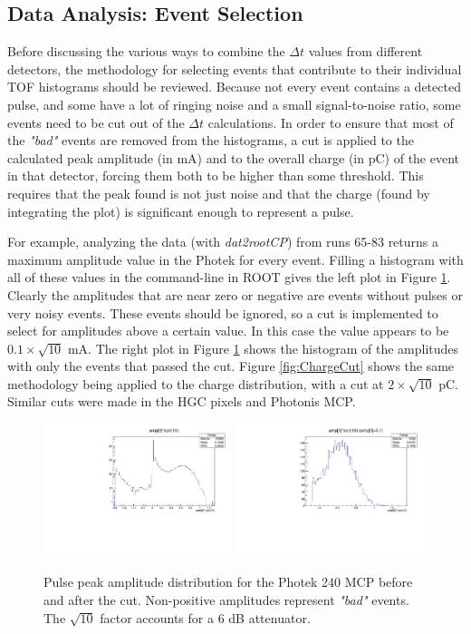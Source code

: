 \documentclass[12pt]{article}
\begin{document}
\subsection{Data Analysis: Event Selection}
Before discussing the various ways to combine the $\Delta t$ values from different detectors, the methodology for selecting events that contribute to their individual TOF histograms should be reviewed.
Because not every event contains a detected pulse, and some have a lot of ringing noise and a small signal-to-noise ratio, some events need to be cut out of the $\Delta t$ calculations. 
In order to ensure that most of the \textit{"bad"} events are removed from the histograms, a cut is applied to the calculated peak amplitude (in mA) and to the overall charge (in pC) of the event in that detector, forcing them both to be higher than some threshold. 
This requires that the peak found is not just noise and that the charge (found by integrating the plot) is significant enough to represent a pulse.

For example, analyzing the data (with \textit{dat2rootCP}) from runs 65-83 returns a maximum amplitude value in the Photek for every event. 
Filling a histogram with all of these values in the command-line in ROOT gives the left plot in Figure \ref{fig:AmpCut}. 
Clearly the amplitudes that are near zero or negative are events without pulses or very noisy events. 
These events should be ignored, so a cut is implemented to select for amplitudes above a certain value. 
In this case the value appears to be $0.1\times\sqrt{10}$ mA. 
The right plot in Figure \ref{fig:AmpCut} shows the histogram of the amplitudes with only the events that passed the cut. 
Figure \ref{fig:ChargeCut} shows the same methodology being applied to the charge distribution, with a cut at $2\times\sqrt{10}$ pC. 
Similar cuts were made in the HGC pixels and Photonis MCP. 

\begin{figure}[h]
\centering
	\includegraphics[width=0.49\textwidth]{AmpCut0.pdf}
	\includegraphics[width=0.49\textwidth]{AmpCut1.pdf}
	\caption{Pulse peak amplitude distribution for the Photek 240 MCP before and after the cut.
		Non-positive amplitudes represent \textit{"bad"} events.
		The $\sqrt{10}$ factor accounts for a 6 dB attenuator.}
	\label{fig:AmpCut}
\end{figure}
\end{document}
